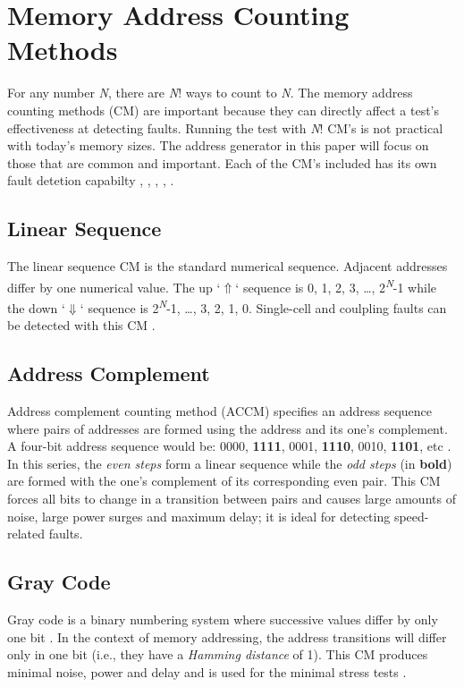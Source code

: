\section{Memory Address Counting Methods}
\label{sect:bg-counting}
For any number \textit{N}, there are \textit{N}! ways to count to \textit{N}.  The memory address counting methods (CM) are important because they can directly affect a test's effectiveness at detecting faults.  Running the test with \textit{N}! CM's is not practical with today's memory sizes.  The address generator in this paper will focus on those that are common and important.  Each of the CM's included has its own fault detetion capabilty \cite{1347645}, \cite{990255}, \cite{1584048}, \cite{5359299}, \cite{1576336}.

\subsection{Linear Sequence}
The linear sequence CM is the standard numerical sequence.  Adjacent addresses differ by one numerical value.  The up `$\Uparrow$` sequence is 0, 1, 2, 3, \ldots, 2\textsuperscript{\textit{N}}-1 while the down `$\Downarrow$` sequence is 2\textsuperscript{\textit{N}}-1, \ldots, 3, 2, 1, 0.  Single-cell and coulpling faults can be detected with this CM \cite{5941430}.

\subsection{Address Complement}
Address complement counting method (ACCM) specifies an address sequence where pairs of addresses are formed using the address and its one's complement.  A four-bit address sequence would be: 0000, \textbf{1111}, 0001, \textbf{1110}, 0010, \textbf{1101}, etc \cite{VanDeGoor1991}.  In this series, the \textit{even steps} form a linear sequence while the \textit{odd steps} (in \textbf{bold}) are formed with the one's complement of its corresponding even pair.  This CM forces all bits to change in a transition between pairs and causes large amounts of noise, large power surges and maximum delay; it is ideal for detecting speed-related faults.

\subsection{Gray Code}
Gray code is a binary numbering system where successive values differ by only one bit \cite{VanDeGoor1991}.  In the context of memory addressing, the address transitions will differ only in one bit (i.e., they have a \textit{Hamming distance} of 1).  This CM produces minimal noise, power and delay and is used for the minimal stress tests \cite{5941430}.


